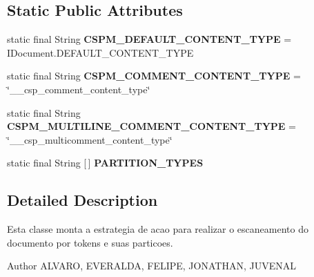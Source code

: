 \subsection*{Static Public Attributes}
\begin{DoxyCompactItemize}
\item 
\mbox{\label{classcom_1_1fware_1_1cspdt_1_1cspm_1_1editor_1_1partition_1_1_csp_m_partition_scanner_aa74e96b60b57ad569d7701af1cc216e1}} 
static final String {\bfseries C\+S\+P\+M\+\_\+\+D\+E\+F\+A\+U\+L\+T\+\_\+\+C\+O\+N\+T\+E\+N\+T\+\_\+\+T\+Y\+PE} = I\+Document.\+D\+E\+F\+A\+U\+L\+T\+\_\+\+C\+O\+N\+T\+E\+N\+T\+\_\+\+T\+Y\+PE
\item 
\mbox{\label{classcom_1_1fware_1_1cspdt_1_1cspm_1_1editor_1_1partition_1_1_csp_m_partition_scanner_a54db76e744688d692d1fd176dbf54eab}} 
static final String {\bfseries C\+S\+P\+M\+\_\+\+C\+O\+M\+M\+E\+N\+T\+\_\+\+C\+O\+N\+T\+E\+N\+T\+\_\+\+T\+Y\+PE} = \char`\"{}\+\_\+\+\_\+csp\+\_\+comment\+\_\+content\+\_\+type\char`\"{}
\item 
\mbox{\label{classcom_1_1fware_1_1cspdt_1_1cspm_1_1editor_1_1partition_1_1_csp_m_partition_scanner_ada9ada17754d6f358a8d5b82cb670f3c}} 
static final String {\bfseries C\+S\+P\+M\+\_\+\+M\+U\+L\+T\+I\+L\+I\+N\+E\+\_\+\+C\+O\+M\+M\+E\+N\+T\+\_\+\+C\+O\+N\+T\+E\+N\+T\+\_\+\+T\+Y\+PE} = \char`\"{}\+\_\+\+\_\+csp\+\_\+multicomment\+\_\+content\+\_\+type\char`\"{}
\item 
static final String \mbox{[}$\,$\mbox{]} {\bfseries P\+A\+R\+T\+I\+T\+I\+O\+N\+\_\+\+T\+Y\+P\+ES}
\end{DoxyCompactItemize}


\subsection{Detailed Description}
Esta classe monta a estrategia de acao para realizar o escaneamento do documento por tokens e suas particoes. 

\begin{DoxyAuthor}{Author}
A\+L\+V\+A\+RO, E\+V\+E\+R\+A\+L\+DA, F\+E\+L\+I\+PE, J\+O\+N\+A\+T\+H\+AN, J\+U\+V\+E\+N\+AL 
\end{DoxyAuthor}


